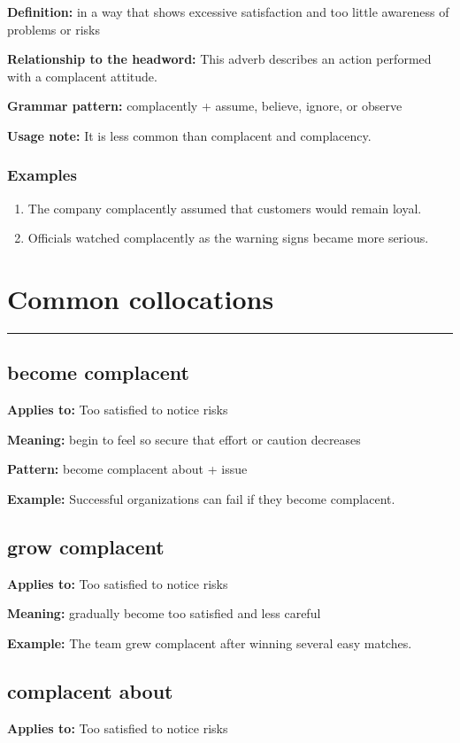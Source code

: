 \documentclass[11pt]{article}
\newcommand{\sectionrule}{\par\vspace{-0.5em}\noindent\textcolor{Accent}{\rule{\linewidth}{0.6pt}}\par}
\begin{document}
\textbf{Definition:} in a way that shows excessive satisfaction and too little awareness of problems or risks

\textbf{Relationship to the headword:} This adverb describes an action performed with a complacent attitude.

\textbf{Grammar pattern:} complacently + assume, believe, ignore, or observe

\textbf{Usage note:} It is less common than complacent and complacency.

\subsubsection{Examples}
\begin{enumerate}
  \item The company complacently assumed that customers would remain loyal.
  \item Officials watched complacently as the warning signs became more serious.
\end{enumerate}

\section{Common collocations}
\sectionrule
\subsection{become complacent}
\textbf{Applies to:} Too satisfied to notice risks

\textbf{Meaning:} begin to feel so secure that effort or caution decreases

\textbf{Pattern:} become complacent about + issue

\textbf{Example:} Successful organizations can fail if they become complacent.

\subsection{grow complacent}
\textbf{Applies to:} Too satisfied to notice risks

\textbf{Meaning:} gradually become too satisfied and less careful

\textbf{Example:} The team grew complacent after winning several easy matches.

\subsection{complacent about}
\textbf{Applies to:} Too satisfied to notice risks
\end{document}
